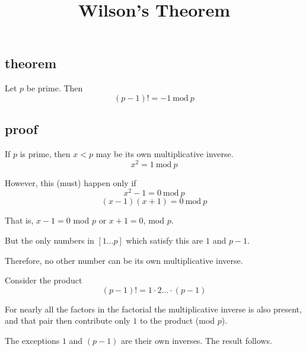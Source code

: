 \documentclass[11pt, oneside]{article}
\title{Wilson's Theorem}
\date{}
\begin{document}
\maketitle
\Large

\subsection*{theorem}

Let $p$ be prime.  Then
\[ (p-1)! = -1 \ \text{mod} \ p \]

\subsection*{proof}

If $p$ is prime, then $x < p$ may be its own multiplicative inverse. 
\[ x^2 = 1 \ \text{mod} \ p  \]

However, this (must) happen only if
\[ x^2 - 1 = 0 \ \text{mod} \ p   \]
\[ (x - 1)(x + 1) = 0 \ \text{mod} \ p  \]

That is, $x - 1 = 0$ mod $p$ or $x + 1 = 0$, mod $p$.

But the only numbers in $[1 \dots p]$ which satisfy this are $1$ and $p-1$.  

Therefore, no other number can be its own multiplicative inverse.

Consider the product 
\[ (p-1)! = 1 \cdot 2 \dots \cdot (p-1) \]

For nearly all the factors in the factorial the multiplicative inverse is also present, and that pair then contribute only $1$ to the product (mod $p$).

The exceptions $1$ and $(p-1)$ are their own inverses.  The result follows.
\end{document}
